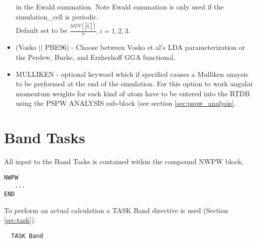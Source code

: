 \begin{itemize}
                          in the Ewald summation.  Note Ewald summation
                          is only used if the simulation\_cell is periodic. \\
                          Default set to be
                          $\frac{MIN(\left| \vec{a_i} \right|)}{\pi}, i=1,2,3$.
        \item (Vosko $||$ PBE96) - Choose between Vosko et al's LDA 
                               parameterization or the Perdew, Burke, 
                               and Erzherhoff GGA functional.
        \item MULLIKEN - optional keyword which if specified
                         causes a Mulliken anaysis to be performed at
                         the end of the simulation.  For this option
                         to work angular momentum weights for each kind
                         of atom have to be entered into the RTDB using
                         the PSPW ANALYSIS sub-block (see section \ref{sec:pspw_analysis}.
\end{itemize}





\section{Band Tasks}
\label{sec:band_tasks}

All input to the Band Tasks is contained within the compound NWPW block,
\begin{verbatim}
NWPW
   ...
END
\end{verbatim}

To perform an actual calculation a TASK Band directive is used (Section \ref{sec:task}).  
\begin{verbatim}
  TASK Band
\end{verbatim} 

